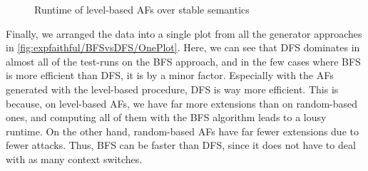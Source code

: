 \begin{figure}[H]
    \centering
    \caption{Runtime of level-based AFs over stable semantics}
    \label{fig:expfaithful/BFSvsDFS/level/ST}
\end{figure}


Finally, we arranged the data into a single plot from all the generator approaches in \cref{fig:expfaithful/BFSvsDFS/OnePlot}. Here, we can see that DFS dominates in almost all of the test-runs on the BFS approach, and in the few cases where BFS is more efficient than DFS, it is by a minor factor. Especially with the AFs generated with the level-based procedure, DFS is way more efficient. This is because, on level-based AFs, we have far more extensions than on random-based ones, and computing all of them with the BFS algorithm leads to a lousy runtime. On the other hand, random-based AFs have far fewer extensions due to fewer attacks. Thus, BFS can be faster than DFS, since it does not have to deal with as many context switches.

